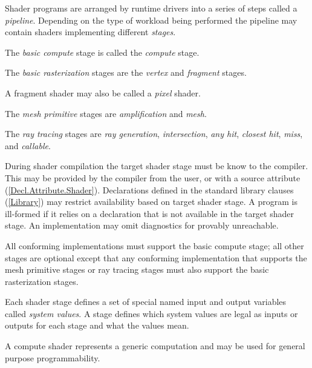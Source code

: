 
\p Shader programs are arranged by runtime drivers into a series of steps called
a \textit{pipeline}. Depending on the type of workload being performed the
pipeline may contain shaders implementing different \textit{stages}.

\p The \textit{basic compute} stage is called the \textit{compute} stage.

\p The \textit{basic rasterization} stages are the \textit{vertex} and
\textit{fragment} stages.

\begin{note}
A fragment shader may also be called a \textit{pixel} shader.
\end{note}

\p The \textit{mesh primitive} stages are \textit{amplification} and
\textit{mesh}.

\p The \textit{ray tracing} stages are \textit{ray generation},
\textit{intersection}, \textit{any hit}, \textit{closest hit}, \textit{miss},
and \textit{callable}.

\p During shader compilation the target shader stage must be know to the
compiler. This may be provided by the compiler from the user, or with a source
attribute (\ref{Decl.Attribute.Shader}). Declarations defined in the standard
library clauses (\ref{Library}) may restrict availability based on target shader
stage. A program is ill-formed if it relies on a declaration that is not
available in the target shader stage. An implementation may omit diagnostics for
provably unreachable.

\p All conforming implementations must support the basic compute stage; all
other stages are optional except that any conforming implementation that
supports the mesh primitive stages or ray tracing stages must also support the
basic rasterization stages.

\p Each shader stage defines a set of special named input and output variables
called \textit{system values}. A stage defines which system values are legal as
inputs or outputs for each stage and what the values mean.


\p A compute shader represents a generic computation and may be used for general
purpose programmability.



